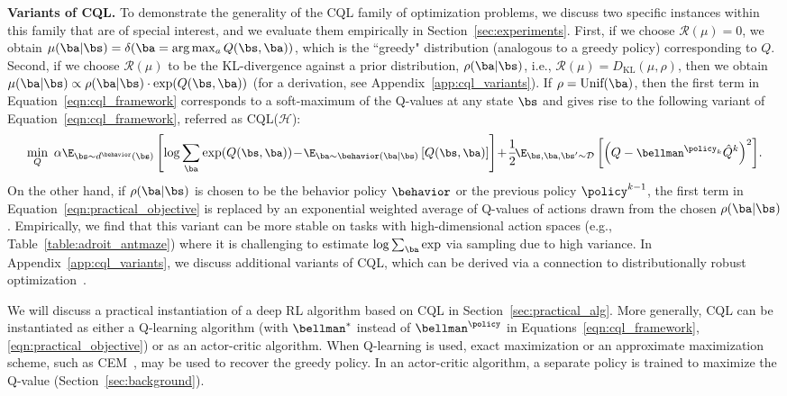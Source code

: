 \textbf{Variants of CQL.} To demonstrate the generality of the CQL family of optimization problems, we discuss two specific instances within this family that are of special interest, and we evaluate them empirically in Section~\ref{sec:experiments}. First, if we choose $\mathcal{R}(\mu) = 0$, we obtain \mbox{$\mu(\ba|\bs) = \delta(\ba = \arg\max_{a} {Q}(\bs, \ba))$}, which is the ``greedy" distribution (analogous to a greedy policy) corresponding to $Q$. Second, if we choose $\mathcal{R}(\mu)$ to be the KL-divergence against a prior distribution, $\rho(\ba|\bs)$, i.e., $\mathcal{R}(\mu) = D_{\mathrm{KL}}(\mu, \rho)$, then we obtain $\mu(\ba|\bs) \propto \rho(\ba|\bs) \cdot \exp (Q(\bs, \ba))$ (for a derivation, see Appendix~\ref{app:cql_variants}). If $\rho = \text{Unif}(\ba)$,
then the first term in Equation~\ref{eqn:cql_framework} corresponds to a soft-maximum of the Q-values at any state $\bs$ and gives rise to the following variant of Equation~\ref{eqn:cql_framework}, referred as CQL($\mathcal{H}$):
\begin{equation}
    \small{\min_{Q}~ \alpha \E_{\bs \sim d^\behavior(\bs)}\left[\log \sum_{\ba} \exp(Q(\bs, \ba))\!-\!\E_{\ba \sim \behavior(\ba|\bs)}\left[Q(\bs, \ba)\right]\right]\!+\!\frac{1}{2}\!\E_{\bs, \ba, \bs' \sim \mathcal{D}}\left[\left(Q - \bellman^{\policy_k} \hat{Q}^{k} \right)^2 \right]\!.}
    \label{eqn:practical_objective}
\end{equation}
On the other hand, if $\rho(\ba|\bs)$ is chosen to be the behavior policy $\behavior$ or the previous policy $\policy^{k-1}$, the first term in Equation~\ref{eqn:practical_objective} is replaced by an exponential weighted average of Q-values of actions drawn from the chosen $\rho(\ba|\bs)$. Empirically, we find that this variant can be more stable on tasks with high-dimensional action spaces (e.g., Table~\ref{table:adroit_antmaze}) where it is challenging to estimate $\log \sum_{\ba} \exp$ via sampling due to high variance. In Appendix~\ref{app:cql_variants}, we discuss additional variants of CQL, which can be derived via a connection to distributionally robust optimization~\citep{namkoong2017variance}.  

We will discuss a practical instantiation of a deep RL algorithm based on CQL in Section~\ref{sec:practical_alg}. More generally, CQL can be instantiated as either a Q-learning algorithm (with $\bellman^*$ instead of $\bellman^{\policy}$ in Equations~\ref{eqn:cql_framework}, \ref{eqn:practical_objective}) or as an actor-critic algorithm. When Q-learning is used, exact maximization or an approximate maximization scheme, such as CEM~\citep{kalashnikov2018qtopt}, may be used to recover the greedy policy. In an actor-critic algorithm, a separate policy is trained to maximize the Q-value (Section~\ref{sec:background}).

